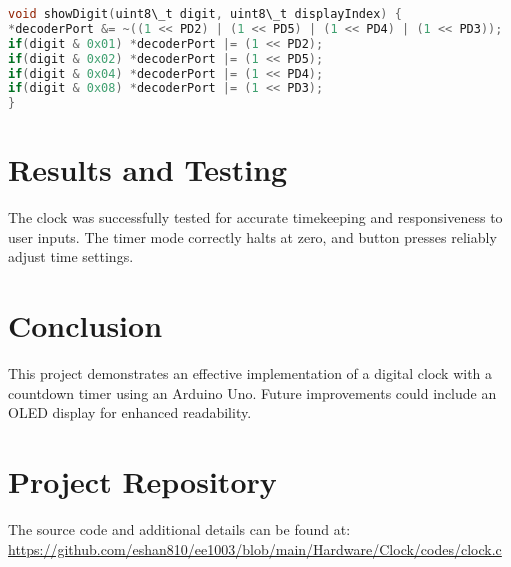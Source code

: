 \documentclass{article}
\begin{document}
\begin{lstlisting}[language=C, caption=Show Digit Function]
void showDigit(uint8\_t digit, uint8\_t displayIndex) {
*decoderPort &= ~((1 << PD2) | (1 << PD5) | (1 << PD4) | (1 << PD3));
if(digit & 0x01) *decoderPort |= (1 << PD2);
if(digit & 0x02) *decoderPort |= (1 << PD5);
if(digit & 0x04) *decoderPort |= (1 << PD4);
if(digit & 0x08) *decoderPort |= (1 << PD3);
}
\end{lstlisting}

\section{Results and Testing}
The clock was successfully tested for accurate timekeeping and responsiveness to user inputs. The timer mode correctly halts at zero, and button presses reliably adjust time settings.

\section{Conclusion}
This project demonstrates an effective implementation of a digital clock with a countdown timer using an Arduino Uno. Future improvements could include  an OLED display for enhanced readability.

\section{Project Repository}
The source code and additional details can be found at: \\ 
\href{https://github.com/eshan810/ee1003/blob/main/Hardware/Clock/codes/clock.c}{https://github.com/eshan810/ee1003/blob/main/Hardware/Clock/codes/clock.c}
\end{document}

